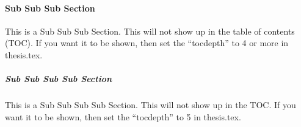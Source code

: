  
\paragraph{Sub Sub Sub Section}\label{sec:subsubsubsection}
This is a Sub Sub Sub Section. This will not show up in the table of contents (TOC). If you want it to be shown, then set the ``tocdepth'' to 4 or more in thesis.tex.

\subparagraph{Sub Sub Sub Sub Section}\label{sec:subsubsubsubsection}
This is a Sub Sub Sub Sub Section. This will not show up in the TOC. If you want it to be shown, then set the ``tocdepth'' to 5 in thesis.tex.